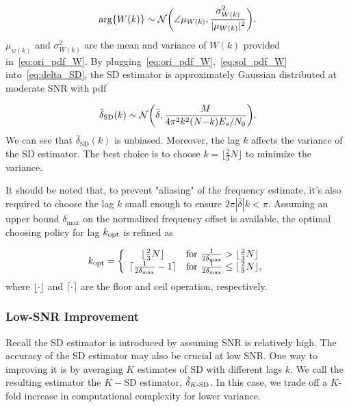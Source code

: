 \begin{equation}
    \label{eq:sol_pdf_W}
    \arg\{W(k)\} \sim \mathcal{N}\bigg(\angle \mu_{W(k)},\frac{\sigma^2_{W(k)}}{|\mu_{W(k)}|^2}\bigg).
  \end{equation}
$\mu_{w(k)}$ and $\sigma^2_{W(k)}$ are the mean and variance of $W(k)$ provided in~\eqref{eq:ori_pdf_W}.
By plugging~\eqref{eq:ori_pdf_W},~\eqref{eq:sol_pdf_W} into~\eqref{eq:delta_SD}, the SD estimator
is approximately Gaussian distributed at moderate SNR with pdf

\begin{equation}
    \label{eq:pdf_delta}
        \hat{\delta}_{\text{SD}}(k) \sim \mathcal{N} \bigg(\bar{\delta},\frac{M}{4\pi^2k^2(N{-}k)E_s/N_0}\bigg).
  \end{equation}  
We can see that $\hat{\delta}_{\text{SD}}(k)$ is unbiased. Moreover, the lag $k$ affects the variance of the SD estimator. 
The best choice is to choose $k=\lfloor\frac{2}{3}N\rfloor$ to minimize the variance.

It should be noted that, to prevent "aliasing" of the frequency estimate, it's also required to choose the lag $k$ small enough to ensure $2\pi |\bar{\delta}| k < \pi$.
Assuming an upper bound $\delta_{\text{max}}$ on the normalized frequency offset is available, 
the optimal choosing policy for lag $k_{\text{opt}}$ is refined as

\begin{equation}
    \label{eq:est_k_opt}
    k_{\text{opt}}=\left\{
      \begin{array}{cl}
        \lfloor\frac{2}{3}N\rfloor
        & \text{for $\frac{1}{2\delta_{\max}}>\lfloor\frac{2}{3}N\rfloor$} \\
        \lceil\frac{1}{2\delta_{\max}}-1\rceil
        & \text{for $\frac{1}{2\delta_{\max}} \leq\lfloor\frac{2}{3}N\rfloor$},
      \end{array}
    \right.
  \end{equation}
where $\lfloor \cdot \rfloor$ and $\lceil \cdot \rceil$ are the floor and ceil operation, respectively.

\subsubsection{Low-SNR Improvement}
Recall the SD estimator is introduced by assuming SNR is relatively high. 
The accuracy of the SD estimator may also be crucial at low SNR.
One way to improving it is by averaging $K$ estimates of SD with different lags $k$.
We call the resulting estimator the $K-$SD estimator, $\hat{\delta}_{K\text{-SD}}$.
In this case, we trade off a $K$-fold increase in computational complexity for lower variance.


